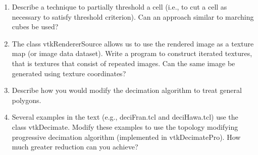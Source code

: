 \begin{enumerate}
\item Describe a technique to partially threshold a cell (i.e., to cut a cell as necessary to satisfy threshold criterion). Can an approach similar to marching cubes be used?

\item The class vtkRendererSource allows us to use the rendered image as a texture map (or image data dataset). Write a program to construct iterated textures, that is textures that consist of repeated images. Can the same image be generated using texture coordinates?

\item Describe how you would modify the decimation algorithm to treat general polygons.

\item Several examples in the text (e.g., deciFran.tcl and deciHawa.tcl) use the class vtkDecimate. Modify these examples to use the topology modifying progressive decimation algorithm (implemented in vtkDecimatePro). How much greater reduction can you achieve?


\end{enumerate}